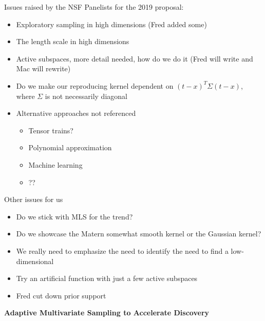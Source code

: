 \documentclass[11pt]{NSFamsart}
\begin{document}

{\color{red}
Issues raised by the NSF Panelists for the 2019 proposal:
\begin{itemize}
	\item Exploratory sampling in high dimensions (Fred added some)
	\item The length scale in high dimensions
	\item Active subspaces, more detail needed, how do we do it (Fred will write and Mac will rewrite)
	\item Do we make our reproducing kernel  dependent on $(t - x)^T \Sigma (t-x)$, where $\Sigma$ is not necessarily diagonal
	\item Alternative approaches not referenced
	\begin{itemize}
		\item Tensor trains?
		\item Polynomial approximation
		\item Machine learning
		\item ??
	\end{itemize}
\end{itemize}

Other issues for us
\begin{itemize}
	\item Do we stick with MLS for the trend?
	\item Do we showcase the Matern somewhat smooth kernel or the Gaussian kernel?
	\item We really need to emphasize the need to identify the need to find a low-dimensional 
	\item Try an artificial function with just a few active subspaces
	\item \checkmark Fred cut down prior support
	
\end{itemize}
}

\begin{center}
\Large \textbf{
Adaptive Multivariate Sampling to Accelerate Discovery\\ 
}
\end{center}
\vspace{-2ex}

\setcounter{tocdepth}{1}
\tableofcontents

\vspace{-6ex}
\end{document}
